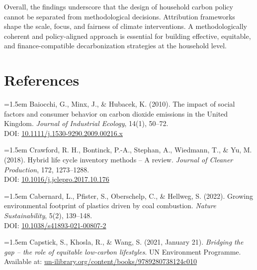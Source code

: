 \documentclass[12pt,a4paper]{article}%
\begin{document}
Overall, the findings underscore that the design of household carbon policy cannot be separated from methodological decisions. Attribution frameworks shape the scale, focus, and fairness of climate interventions. A methodologically coherent and policy-aligned approach is essential for building effective, equitable, and finance-compatible decarbonization strategies at the household level.

\newpage

\section*{References}

\vspace{0.5em}
{\small
\noindent
\parbox{\linewidth}{
\hangindent=1.5em
Baiocchi, G., Minx, J., \& Hubacek, K. (2010). The impact of social factors and consumer behavior on carbon dioxide emissions in the United Kingdom. \textit{Journal of Industrial Ecology}, 14(1), 50–72. \\
DOI: \href{https://doi.org/10.1111/j.1530-9290.2009.00216.x}{10.1111/j.1530-9290.2009.00216.x}
}
}

{\small
\noindent
\parbox{\linewidth}{
\hangindent=1.5em
Crawford, R. H., Bontinck, P.-A., Stephan, A., Wiedmann, T., \& Yu, M. (2018). Hybrid life cycle inventory methods – A review. \textit{Journal of Cleaner Production}, 172, 1273–1288. \\
DOI: \href{https://doi.org/10.1016/j.jclepro.2017.10.176}{10.1016/j.jclepro.2017.10.176}
}
}

\vspace{0.5em}
{\small
\noindent
\parbox{\linewidth}{
\hangindent=1.5em
Cabernard, L., Pfister, S., Oberschelp, C., \& Hellweg, S. (2022). Growing environmental footprint of plastics driven by coal combustion. \textit{Nature Sustainability}, 5(2), 139–148. \\
DOI: \href{https://doi.org/10.1038/s41893-021-00807-2}{10.1038/s41893-021-00807-2}
}
}

\vspace{0.5em}
{\small
\noindent
\parbox{\linewidth}{
\hangindent=1.5em
Capstick, S., Khosla, R., \& Wang, S. (2021, January 21). \textit{Bridging the gap – the role of equitable low-carbon lifestyles}. UN Environment Programme. \\
Available at: \href{https://www.un-ilibrary.org/content/books/9789280738124c010}{un-ilibrary.org/content/books/9789280738124c010}
}
}
\end{document}
